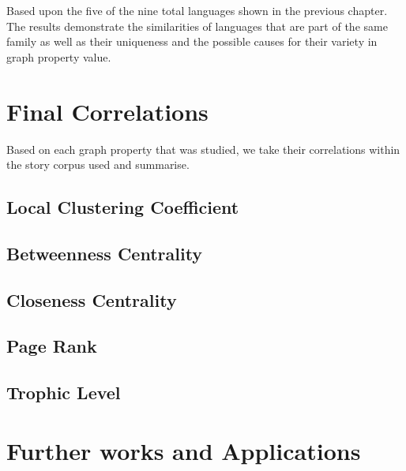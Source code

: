 Based upon the five of the nine total languages shown in the previous chapter. The results demonstrate the similarities of languages that are part of the same family as well as their uniqueness and the possible causes for their variety in graph property value.
\section{Final Correlations}
Based on each graph property that was studied, we take their correlations within the story corpus used and summarise.
\subsection{Local Clustering Coefficient}

\subsection{Betweenness Centrality}

\subsection{Closeness Centrality}

\subsection{Page Rank}

\subsection{Trophic Level}


\section{Further works and Applications}

